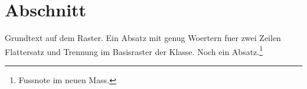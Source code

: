\documentclass{swisstex}
\begin{document}
\section{Abschnitt}
Grundtext auf dem Raster. Ein Absatz mit genug Woertern fuer zwei Zeilen
Flattersatz und Trennung im Basisraster der Klasse.
Noch ein Absatz.\footnote{Fussnote im neuen Mass.}
\end{document}
